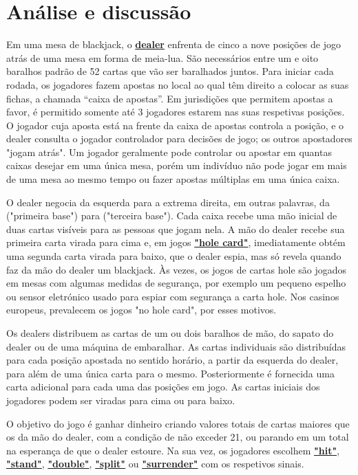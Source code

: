 \documentclass{report}
\begin{document}
\chapter{Análise e discussão}
\label{chap.Regras do jogo}
Em uma mesa de blackjack, o \hyperlink{Glossário}{\textbf{dealer}} enfrenta de cinco a nove posições de jogo atrás de uma mesa em forma de meia-lua. São necessários entre um e oito baralhos padrão de 52 cartas que vão ser baralhados juntos. Para iniciar cada rodada, os jogadores fazem apostas no local ao qual têm direito a colocar as suas fichas, a chamada “caixa de apostas”. Em jurisdições que permitem apostas a favor, é permitido somente até 3 jogadores estarem nas suas respetivas posições. O jogador cuja aposta está na frente da caixa de apostas controla a posição, e o dealer consulta o jogador controlador para decisões de jogo; os outros apostadores "jogam atrás". Um jogador geralmente pode controlar ou apostar em quantas caixas desejar em uma única mesa, porém um indivíduo não pode jogar em mais de uma mesa ao mesmo tempo ou fazer apostas múltiplas em uma única caixa.
 
O dealer negocia da esquerda para a extrema direita, em outras palavras, da ("primeira base") para ("terceira base"). Cada caixa recebe uma mão inicial de duas cartas visíveis para as pessoas que jogam nela. A mão do dealer recebe sua primeira carta virada para cima e, em jogos \hyperlink{Glossário}{\textbf{"hole card"}}, imediatamente obtém uma segunda carta virada para baixo, que o dealer espia, mas só revela quando faz da mão do dealer um blackjack. Às vezes, os jogos de cartas hole são jogados em mesas com algumas medidas de segurança, por exemplo um pequeno espelho ou sensor eletrónico usado para espiar com segurança a carta hole. Nos casinos europeus, prevalecem os jogos "no hole card", por esses motivos.
 
Os dealers distribuem as cartas de um ou dois baralhos de mão, do sapato do dealer ou de uma máquina de embaralhar. As cartas individuais são distribuídas para cada posição apostada no sentido horário, a partir da esquerda do dealer, para além de uma única carta para o mesmo. Posteriormente é fornecida uma carta adicional para cada uma das posições em jogo. As cartas iniciais dos jogadores podem ser viradas para cima ou para baixo.
 
O objetivo do jogo é ganhar dinheiro criando valores totais de cartas maiores que os da mão do dealer, com a condição de não exceder 21, ou parando em um total na esperança de que o dealer estoure. Na sua vez, os jogadores escolhem \hyperlink{Decisões do jogador}{\textbf{"hit"}}, \hyperlink{Decisões do jogador}{\textbf{"stand"}}, \hyperlink{Decisões do jogador}{\textbf{"double"}}, \hyperlink{Decisões do jogador}{\textbf{"split"}} ou \hyperlink{Decisões do jogador}{\textbf{"surrender"}} com os respetivos sinais.
 
\end{document}

